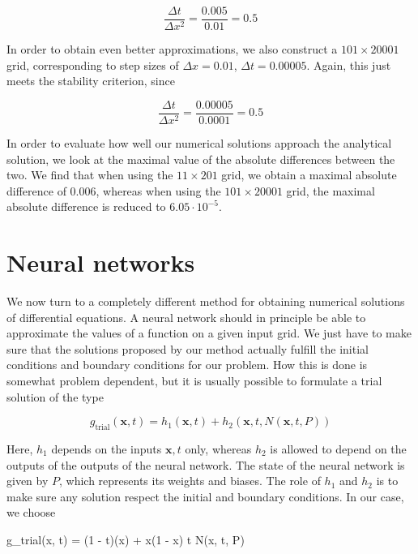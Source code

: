 \documentclass{article}
\begin{document}
\begin{equation}
    \frac{\Delta t}{\Delta x^2} = \frac{0.005}{0.01}=0.5
\end{equation}

In order to obtain even better approximations, we also construct a $101 \times 20001$ grid, corresponding to step sizes of $\Delta x = 0.01$, $\Delta t = 0.00005$. Again, this just meets the stability criterion, since

\begin{equation}
    \frac{\Delta t}{\Delta x^2} = \frac{0.00005}{0.0001}=0.5
\end{equation}

In order to evaluate how well our numerical solutions approach the analytical solution, we look at the maximal value of the absolute differences between the two. We find that when using the $11 \times 201$ grid, we obtain a maximal absolute difference of 0.006, whereas when using the $101 \times 20001$ grid, the maximal absolute difference is reduced to $6.05 \cdot 10^{-5}$.

\section{Neural networks}
We now turn to a completely different method for obtaining numerical solutions of differential equations. A neural network should in principle be able to approximate the values of a function on a given input grid. We just have to make sure that the solutions proposed by our method actually fulfill the initial conditions and boundary conditions for our problem. How this is done is somewhat problem dependent, but it is usually possible to formulate a trial solution of the type

\begin{equation}
    g_{\textrm{trial}}(\mathbf{x}, t) = h_1(\mathbf{x}, t) + h_2(\mathbf{x}, t, N(\mathbf{x}, t, P))
\end{equation}

Here, $h_1$ depends on the inputs $\mathbf{x}, t$ only, whereas $h_2$ is allowed to depend on the outputs of the outputs of the neural network. The state of the neural network is given by $P$, which represents its weights and biases. The role of $h_1$ and $h_2$ is to make sure any solution respect the initial and boundary conditions. In our case, we choose

\begin{env}
    g_{\textrm{trial}}(x, t) = (1 - t)\sin(\pi x) + x(1 - x) t N(x, t, P)
\end{env}
\end{document}
